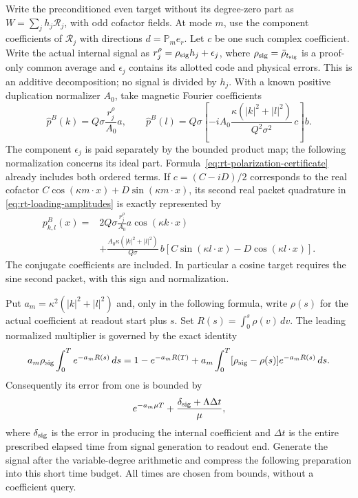 \documentclass[11pt,a4paper]{amsart}
\theoremstyle{definition}
\theoremstyle{remark}
\numberwithin{equation}{section}
\newcommand{\PP}{\mathbb P}
\begin{document}
Write the preconditioned even target without its degree-zero part as
$W=\sum_j h_j\mathcal R_j$, with odd cofactor fields.  At mode $m$, use
the component coefficients of $\mathcal R_j$ with directions
$d=\PP_me_r$.  Let $c$ be one such complex coefficient.  Write the actual
internal signal as $r_j^\rho=\rho_{\rm sig}h_j+\epsilon_j$, where
$\rho_{\rm sig}=\bar\rho_{t_{\rm sig}}$ is a proof-only common average
and $\epsilon_j$ contains its allotted code and physical errors.
This is an additive decomposition; no signal is divided by $h_j$.
With a known positive duplication normalizer $A_0$, take magnetic Fourier coefficients
\begin{equation}\label{eq:rt-loading-amplitudes}
 \widehat p^B(k)=Q\sigma\frac{r_j^\rho}{A_0}a,
 \qquad
 \widehat p^B(l)=Q\sigma\left[
       -iA_0\frac{\kappa(|k|^2+|l|^2)}{Q^2\sigma^2}\,c\right]b.
\end{equation}
The component $\epsilon_j$ is paid separately by the bounded product map;
the following normalization concerns its ideal part.
Formula~\eqref{eq:rt-polarization-certificate} already includes
both ordered terms.  If $c=(C-iD)/2$ corresponds to the real cofactor
$C\cos(\kappa m\cdot x)+D\sin(\kappa m\cdot x)$, its second real
packet quadrature in \eqref{eq:rt-loading-amplitudes} is exactly represented by
\begin{equation}\label{eq:rt-real-phase}
 \begin{aligned}
 p^B_{k,l}(x)={}&2Q\sigma\frac{r_j^\rho}{A_0}a
                                         \cos(\kappa k\cdot x)\\
 &+\frac{A_0\kappa(|k|^2+|l|^2)}{Q\sigma}\,b
       [C\sin(\kappa l\cdot x)-D\cos(\kappa l\cdot x)].
 \end{aligned}
\end{equation}
The conjugate coefficients are included.  In particular a cosine target requires the sine second
packet, with this sign and normalization.

Put $a_m=\kappa^2(|k|^2+|l|^2)$ and, only in the following formula,
write $\rho(s)$ for the actual coefficient at readout start plus $s$.
Set $R(s)=\int_0^s\rho(v)\,dv$.  The leading normalized
multiplier is governed by the exact identity
\begin{equation}\label{eq:rt-nonautonomous-normalization}
 a_m\rho_{\rm sig}\int_0^T e^{-a_mR(s)}\,ds
 =1-e^{-a_mR(T)}+
   a_m\int_0^T[\rho_{\rm sig}-\rho(s)]e^{-a_mR(s)}\,ds.
\end{equation}
Consequently its error from one is bounded by
\begin{equation}\label{eq:rt-rho-error}
 e^{-a_m\mu T}+
 \frac{\delta_{\rm sig}+\Lambda\Delta t}{\mu},
\end{equation}
where $\delta_{\rm sig}$ is the error in producing the internal coefficient
and $\Delta t$ is the entire prescribed elapsed time from signal generation
to readout end.  Generate the signal after the variable-degree arithmetic
and compress the following preparation into this short time budget.
All times are chosen from bounds, without a coefficient query.
\end{document}
